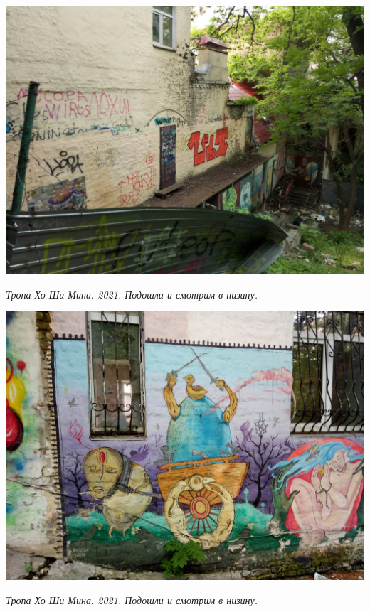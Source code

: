 \begin{center}
\includegraphics[width=\linewidth]{rpix/IMG_20210601_134945.jpg}

\textit{Тропа Хо Ши Мина. 2021. Подошли и смотрим в низину.}
\end{center}



\begin{center}
\includegraphics[width=\linewidth]{rpix/IMG_20210601_135238.jpg}

\textit{Тропа Хо Ши Мина. 2021. Подошли и смотрим в низину.}
\end{center}


